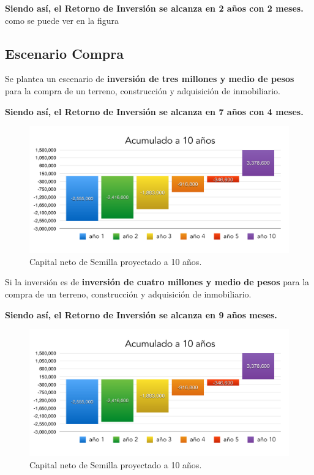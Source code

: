 \documentclass[10pt,letterpaper,oneside]{book}
\begin{document}
\vspace{0.2cm}
{\bf\large \color{red} Siendo así, el Retorno de Inversión se alcanza en 2 años con 2 meses.} como se puede ver en la figura 



\subsection{Escenario Compra}
Se plantea un escenario de {\bf inversión de tres millones y medio de pesos} para la compra de un terreno, construcción y adquisición de inmobiliario.

\vspace{0.2cm}
{\bf\large \color{red} Siendo así, el Retorno de Inversión se alcanza en 7 años con 4 meses.}

\begin{figure}[h]
\begin{center}
\includegraphics[scale=0.4]{10anos2.pdf}
\caption{Capital neto de Semilla proyectado a 10 años.}
\label{Proyeccion10.1}
\end{center}
\end{figure}

Si la inversión es de {\bf inversión de cuatro millones y medio de pesos} para la compra de un terreno, construcción y adquisición de inmobiliario.

\vspace{0.2cm}
{\bf\large \color{red} Siendo así, el Retorno de Inversión se alcanza en 9 años meses.}

\begin{figure}[h]
\begin{center}
\includegraphics[scale=0.4]{10anos1.pdf}
\caption{Capital neto de Semilla proyectado a 10 años.}
\label{Proyeccion10.1}
\end{center}
\end{figure}
\end{document}
